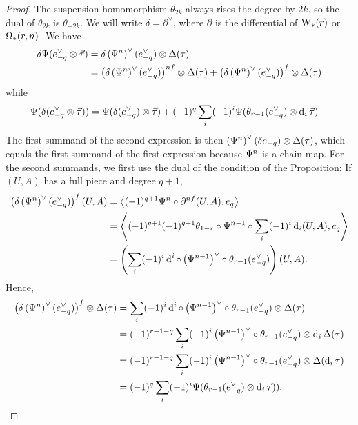 \begin{proof}
The suspension homomorphism $\theta_{2k}$ always rises the degree by $2k$, so the dual of $\theta_{2k}$ is $\theta_{-2k}$. We will write $\delta = \partial^\vee$, where $\partial$ is the differential of $\operatorname{W}_{*}(r)$ or $\operatorname{\Omega}_{*}(r,n)$. We have
\begin{align*}
	\delta \Psi(e_{-q}^\vee\otimes \vec{\tau})
		&= \delta \left(\Psi^n\right)^{\vee}(e_{-q}^\vee)\otimes \Delta(\tau)\\
		&= \left(\delta\left(\Psi^n\right)^{\vee}(e_{-q}^\vee)\right)^{nf}\otimes\Delta(\tau) + \left(\delta\left(\Psi^n\right)^{\vee}(e_{-q}^\vee)\right)^{f}\otimes\Delta(\tau)
\end{align*}
while
\begin{align*}
	\Psi(\delta(e_{-q}^\vee\otimes \vec{\tau}))
		&=\Psi(\delta(e_{-q}^\vee)\otimes \vec{\tau}) + (-1)^{q} \sum_i (-1)^{i} \Psi(\theta_{r-1}(e_{-q}^\vee)\otimes \operatorname{d}_i \vec{\tau})
	\end{align*}
The first summand of the second expression is then $\left(\Psi^n\right)^\vee(\delta e_{-q})\otimes \Delta(\tau)$, which equals the first summand of the first expression because $\Psi^{n}$ is a chain map. For the second summands, we first use the dual of the condition of the Proposition: If $(U,A)$ has a full piece and degree $q+1$,
\begin{align*}
	\left(\delta\left(\Psi^n\right)^\vee (e_{-q}^\vee)\right)^{f}(U,A)
	&= \left\langle (-1)^{q+1}\Psi^n\circ \partial^{nf}(U,A),e_{q}\right\rangle
	\\
	&= \left\langle (-1)^{q+1}(-1)^{q+1}\theta_{1-r}\circ \Psi^{n-1}\circ \sum_i (-1)^i \operatorname{d}_i(U,A),e_q\right\rangle
	\\
	&= \left(\sum_i (-1)^i\operatorname{d}^i\circ \left(\Psi^{n-1}\right)^{\vee}\circ \theta_{r-1}(e_{-q}^\vee)\right)(U,A).
\end{align*}
Hence,
\begin{align*}
	\left(\delta\left(\Psi^n\right)^{\vee}(e_{-q}^\vee)\right)^{f}\otimes\Delta(\tau)
		&= \sum_i (-1)^i \operatorname{d}^i\circ \left(\Psi^{n-1}\right)^\vee\circ \theta_{r-1} (e_{-q}^\vee)\otimes\Delta(\tau)
		\\
		&=(-1)^{r-1-q}\sum_i (-1)^i\left(\Psi^{n-1}\right)^\vee \circ \theta_{r-1} (e_{-q}^\vee)\otimes \operatorname{d}_i\Delta(\tau)
		\\
		&= (-1)^{r-1-q}\sum_i (-1)^i\left(\Psi^{n-1}\right)^\vee \circ \theta_{r-1} (e_{-q}^\vee)\otimes \Delta(\operatorname{d}_i\tau)
		\\
	&= (-1)^q\sum_i (-1)^{i} \Psi(\theta_{r-1}(e_{-q}^\vee)\otimes \operatorname{d}_i \vec{\tau})).\qedhere
\end{align*}
\end{proof}

